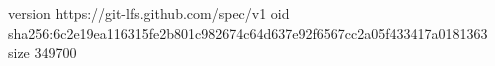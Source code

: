 version https://git-lfs.github.com/spec/v1
oid sha256:6c2e19ea116315fe2b801c982674c64d637e92f6567cc2a05f433417a0181363
size 349700
